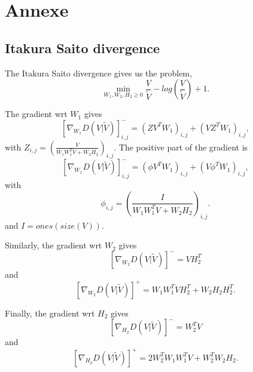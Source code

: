 \documentclass{article}
\begin{document}
\section{Annexe}
 
\subsection{Itakura Saito divergence}\label{ISdisteq}
The Itakura Saito divergence gives us the problem,
$$\min_{W_1,W_2,H_2 \geq 0} \frac{V}{\tilde{V}} - log(\frac{V}{\tilde{V}}) +1.$$

The gradient wrt $W_1$ gives
$$[\nabla_{W_1} D(V|\tilde{V})]_{i,j}^{-} = (ZV^TW_1)_{i,j} + (VZ^TW_1)_{i,j},$$
with $Z_{i,j} = (\frac{V}{W_1W_1^TV + W_2H_2})_{i,j}$. 
The positive part of the gradient is
$$[\nabla_{W_1} D(V|\tilde{V})]_{i,j}^{-} = (\phi V^TW_1)_{i,j} + (V \phi^T W_1)_{i,j},$$
with $$ \phi_{i,j} = (\frac{I}{W_1W_1^TV + W_2H_2})_{i,j}.$$ and $I = ones(size(V))$.


Similarly, the gradient wrt $W_2$ gives
$$ [\nabla_{W_2} D(V|\tilde{V})]^{-} = VH_2^T $$
and
$$ [\nabla_{W_2} D(V|\tilde{V})]^{+} = W_1W_1^TVH_2^T + W_2H_2H_2^T.$$

Finally, the gradient wrt $H_2$ gives
$$ [\nabla_{H_2} D(V|\tilde{V})]^{-} = W_2^TV  $$
and
$$ [\nabla_{H_2} D(V|\tilde{V})]^{+} = 2W_2^TW_1W_1^TV + W_2^TW_2H_2. $$






%
%
%
%
\end{document}
